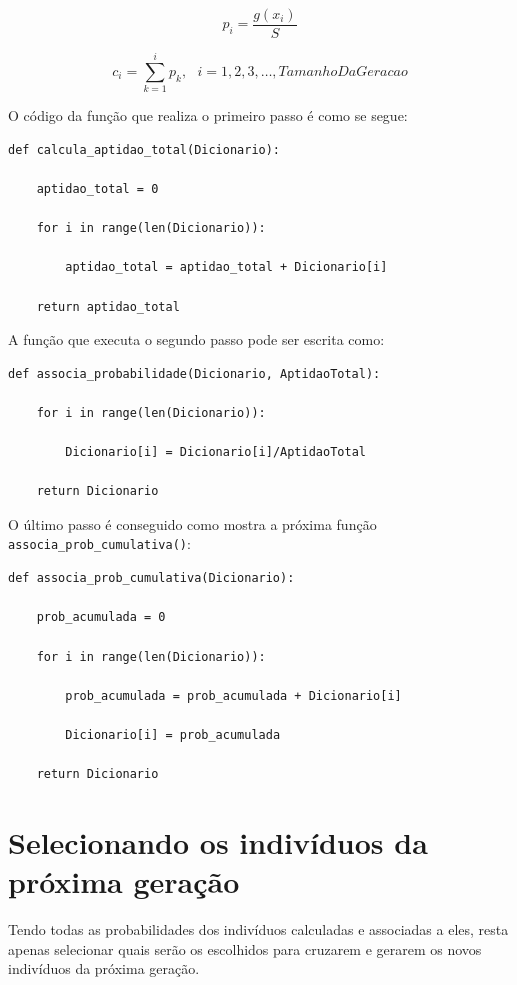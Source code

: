 \documentclass[11pt]{article}
\begin{document}
\begin{equation*}
p_i = \frac{g(x_i)}{S}
\end{equation*}

\begin{equation*}
c_i = \sum_{k = 1}^{i} p_k, ~~~ i = 1, 2, 3,\ldots, TamanhoDaGeracao 
\end{equation*}

O código da função que realiza o primeiro passo é como se segue:

\begin{lstlisting}
def calcula_aptidao_total(Dicionario):

	aptidao_total = 0
	
	for i in range(len(Dicionario)):
	
		aptidao_total = aptidao_total + Dicionario[i]
	
	return aptidao_total
\end{lstlisting}

A função que executa o segundo passo pode ser escrita como:

\begin{lstlisting}
def associa_probabilidade(Dicionario, AptidaoTotal):

	for i in range(len(Dicionario)):
		
		Dicionario[i] = Dicionario[i]/AptidaoTotal
	
	return Dicionario
\end{lstlisting}

O último passo é conseguido como mostra a próxima função \texttt{associa\_prob\_cumulativa()}:

\begin{lstlisting}
def associa_prob_cumulativa(Dicionario):

	prob_acumulada = 0
	
	for i in range(len(Dicionario)):
		
		prob_acumulada = prob_acumulada + Dicionario[i]
		
		Dicionario[i] = prob_acumulada
	
	return Dicionario
\end{lstlisting}

\section{Selecionando os indivíduos da próxima geração}

Tendo todas as probabilidades dos indivíduos calculadas e associadas a eles, resta apenas selecionar quais serão os escolhidos para cruzarem e gerarem os novos indivíduos da próxima geração.
\end{document}

